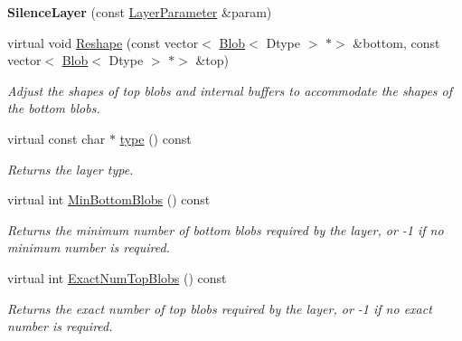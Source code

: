 \begin{DoxyCompactItemize}
\mbox{\label{classcaffe_1_1_silence_layer_a78a184081ba10fef4d0e639eab86122b}} 
{\bfseries Silence\+Layer} (const \mbox{\hyperlink{classcaffe_1_1_layer_parameter}{Layer\+Parameter}} \&param)
\item 
virtual void \mbox{\hyperlink{classcaffe_1_1_silence_layer_a96a47a49a103e60a681f97eff7bf42f2}{Reshape}} (const vector$<$ \mbox{\hyperlink{classcaffe_1_1_blob}{Blob}}$<$ Dtype $>$ $\ast$$>$ \&bottom, const vector$<$ \mbox{\hyperlink{classcaffe_1_1_blob}{Blob}}$<$ Dtype $>$ $\ast$$>$ \&top)
\begin{DoxyCompactList}\small\item\em Adjust the shapes of top blobs and internal buffers to accommodate the shapes of the bottom blobs. \end{DoxyCompactList}\item 
\mbox{\label{classcaffe_1_1_silence_layer_a15c82cb3f0f3da19c07cc9878aa8d6cf}} 
virtual const char $\ast$ \mbox{\hyperlink{classcaffe_1_1_silence_layer_a15c82cb3f0f3da19c07cc9878aa8d6cf}{type}} () const
\begin{DoxyCompactList}\small\item\em Returns the layer type. \end{DoxyCompactList}\item 
virtual int \mbox{\hyperlink{classcaffe_1_1_silence_layer_af916fa4138f5d8761ec4490588eeccd1}{Min\+Bottom\+Blobs}} () const
\begin{DoxyCompactList}\small\item\em Returns the minimum number of bottom blobs required by the layer, or -\/1 if no minimum number is required. \end{DoxyCompactList}\item 
virtual int \mbox{\hyperlink{classcaffe_1_1_silence_layer_a1e072cbda98dbc57001ce92432b045b8}{Exact\+Num\+Top\+Blobs}} () const
\begin{DoxyCompactList}\small\item\em Returns the exact number of top blobs required by the layer, or -\/1 if no exact number is required. \end{DoxyCompactList}\end{DoxyCompactItemize}
